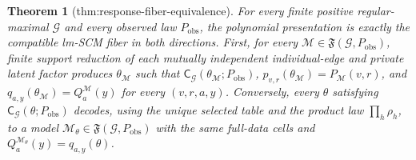 \documentclass{article}
\newtheorem{theorem}{Theorem}
\begin{document}
\begin{theorem}[thm:response-fiber-equivalence]\label{thm:response-fiber-equivalence}
For every finite positive regular-maximal \(\mathcal G\) and every observed law \(P_{\mathrm{obs}}\), the polynomial presentation is exactly the compatible lm-SCM fiber in both directions. First, for every \(\mathcal M\in\mathfrak F(\mathcal G,P_{\mathrm{obs}})\), finite support reduction of each mutually independent individual-edge and private latent factor produces \(\theta_{\mathcal M}\) such that \(\mathsf C_{\mathcal G}(\theta_{\mathcal M};P_{\mathrm{obs}})\), \(p_{v,r}(\theta_{\mathcal M})=P_{\mathcal M}(v,r)\), and \(q_{a,y}(\theta_{\mathcal M})=Q_a^{\mathcal M}(y)\) for every \((v,r,a,y)\). Conversely, every \(\theta\) satisfying \(\mathsf C_{\mathcal G}(\theta;P_{\mathrm{obs}})\) decodes, using the unique selected table and the product law \(\prod_h\rho_h\), to a model \(\mathcal M_{\theta}\in\mathfrak F(\mathcal G,P_{\mathrm{obs}})\) with the same full-data cells and \(Q_a^{\mathcal M_{\theta}}(y)=q_{a,y}(\theta)\).
\end{theorem}
\end{document}
